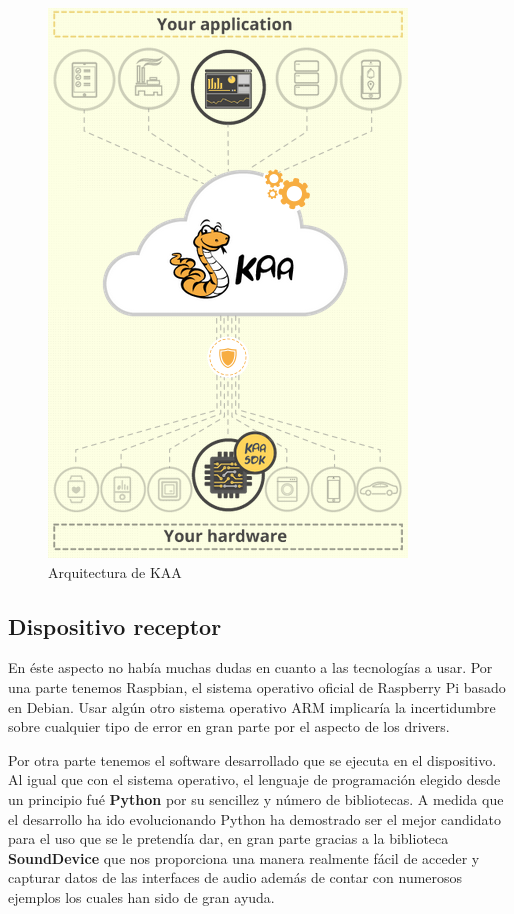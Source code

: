 \begin{figure}[ht]
  \begin{center}
    \includegraphics[scale=0.60]{../images/kaa/arqui.png}
		\caption{Arquitectura de KAA}
    \label{fig:kaalog}
	\end{center}
\end{figure}


\newpage

\subsection{Dispositivo receptor}

En éste aspecto no había muchas dudas en cuanto a las tecnologías a usar. Por una parte tenemos Raspbian, el sistema operativo oficial de Raspberry Pi basado en Debian. Usar algún otro sistema operativo ARM implicaría la incertidumbre sobre cualquier tipo de error en gran parte por el aspecto de los drivers.

\bigskip
Por otra parte tenemos el software desarrollado que se ejecuta en el dispositivo. Al igual que con el sistema operativo, el lenguaje de programación elegido desde un principio fué \textbf{Python} por su sencillez y número de bibliotecas. A medida que el desarrollo ha ido evolucionando Python ha demostrado ser el mejor candidato para el uso que se le pretendía dar, en gran parte gracias a la biblioteca \textbf{SoundDevice} que nos proporciona una manera realmente fácil de acceder y capturar datos de las interfaces de audio además de contar con numerosos ejemplos los cuales han sido de gran ayuda.

